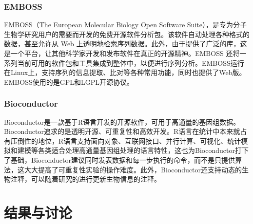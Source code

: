 \documentclass[UTF8]{ctexart}
\begin{document}
\subsubsection{EMBOSS}
EMBOSS（The European Molecular Biology Open Software Suite），是专为分子生物学研究用户的需要而开发的免费开源软件分析包。该软件自动处理各种格式的数据，甚至允许从 Web 上透明地检索序列数据。此外，由于提供了广泛的库，这是一个平台，让其他科学家开发和发布软件在真正的开源精神。EMBOSS 还将一系列当前可用的软件包和工具集成到整体中，以便进行序列分析。EMBOSS运行在Linux上，支持序列的信息提取、比对等各种常用功能，同时也提供了Web版。EMBOSS使用的是GPL和LGPL开源协议。
\subsubsection{Bioconductor}
Bioconductor是一款基于R语言开发的开源软件，可用于高通量的基因组数据。Bioconductor追求的是透明开源、可重复性和高效开发。R语言在统计中本来就占有压倒性的地位，R语言支持面向对象、互联网接口、并行计算、可视化、统计模拟和建模等各类适合处理高通量基因组处理的语言特性，这也为Bioconductor打下了基础，Bioconductor建议同时发表数据和每一步执行的命令，而不是只提供算法，这大大提高了可重复性实验的操作难度。此外，Bioconductor还支持动态的生物注释，可以随着研究的进行更新生物信息的注释。

\section{结果与讨论}



\end{document}

